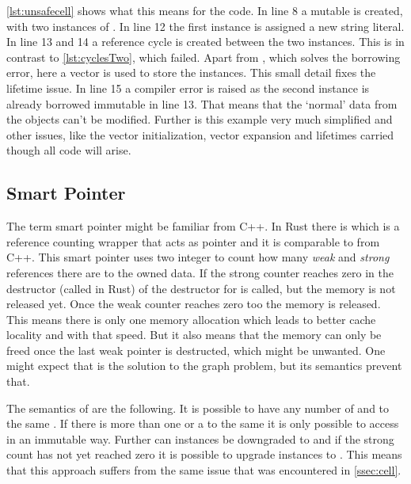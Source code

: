 \documentclass[thesis]{subfiles}
\begin{document}
    \autoref{lst:unsafecell} shows what this means for the code.
    In line 8 a mutable  is created, with two instances of \Node.
    In line 12 the first instance is assigned a new string literal.
    In line 13 and 14 a reference cycle is created between the two  instances.
    This is in contrast to \autoref{lst:cyclesTwo}, which failed.
    Apart from , which solves the borrowing error, here a vector is used to store the \Node instances.
    This small detail fixes the lifetime issue.
    In line 15 a compiler error is raised as the second \Node instance is already borrowed immutable in line 13.
    That means that the `normal' data from the objects can't be modified.
    Further is this example very much simplified and other issues, like the vector initialization, vector expansion and lifetimes carried though all code will arise.

    

  \subsection{Smart Pointer}
    The term smart pointer might be familiar from C++.
    In Rust there is \RcT which is a reference counting wrapper that acts as pointer and it is comparable to  from C++.
    This smart pointer uses two integer to count how many \emph{weak} and \emph{strong} references there are to the owned data.
    If the strong counter reaches zero in the destructor (called  in Rust) of \RcT the destructor for \T is called, but the memory is not released yet.
    Once the weak counter reaches zero too the memory is released.
    This means there is only one memory allocation which leads to better cache locality and with that speed.
    But it also means that the memory can only be freed once the last weak pointer is destructed, which might be unwanted.
    One might expect that \RcT is the solution to the graph problem, but its semantics prevent that.\autocite{rust-doc}

    The semantics of \RcT are the following.
    It is possible to have any number of \RcTs and \WeakTs to the same \T.
    If there is more than one \RcT or a \WeakT to the same \T it is only possible to access \T in an immutable way.
    Further can \RcT instances be downgraded to \WeakT and if the strong count has not yet reached zero it is possible to upgrade \WeakT instances to \RcT.
    This means that this approach suffers from the same issue that was encountered in \autoref{ssec:cell}.\autocite{rust-doc}
\end{document}
